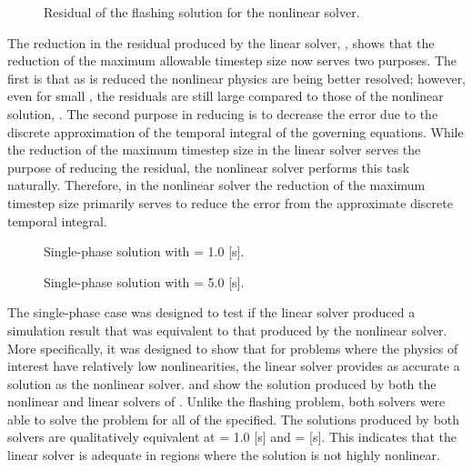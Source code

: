 \begin{figure}[h!tb]
\centering

\caption{Residual of the flashing solution for the nonlinear solver.}
\label{fig:flashingResidualNln}
\end{figure}

The reduction in the residual produced by the linear solver, , shows that the reduction of the maximum allowable timestep size now serves two purposes.
The first is that as \dtmax{} is reduced the nonlinear physics are being better resolved; however, even for small \dtmax{}, the residuals are still large compared to those of the nonlinear solution, .
The second purpose in reducing \dtmax{} is to decrease the error due to the discrete approximation of the temporal integral of the governing equations.
While the reduction of the maximum timestep size in the linear solver serves the purpose of reducing the residual, the nonlinear solver performs this task naturally.
Therefore, in the nonlinear solver the reduction of the maximum timestep size primarily serves to reduce the error from the approximate discrete temporal integral.

\begin{figure}[h!tb]
\centering

\caption{Single-phase solution with \dtmax{} = 1.0 {[s]}.}
\label{fig:single1pt000em0}
\end{figure}

\begin{figure}[h!tb]
\centering

\caption{Single-phase solution with \dtmax{} = 5.0 {[s]}.}
\label{fig:single1pt000em5}
\end{figure}

The single-phase case was designed to test if the linear solver produced a simulation result that was equivalent to that produced by the nonlinear solver.
More specifically, it was designed to show that for problems where the physics of interest have relatively low nonlinearities, the linear solver provides as accurate a solution as the nonlinear solver.
 and  show the solution produced by both the nonlinear and linear solvers of \cobra{}.
Unlike the flashing problem, both solvers were able to solve the problem for all of the \dtmax{} specified.
The solutions produced by both solvers are qualitatively equivalent at \dtmax{} = 1.0 [s] and \dtmax{} =  [s].
This indicates that the linear solver is adequate in regions where the solution is not highly nonlinear.

